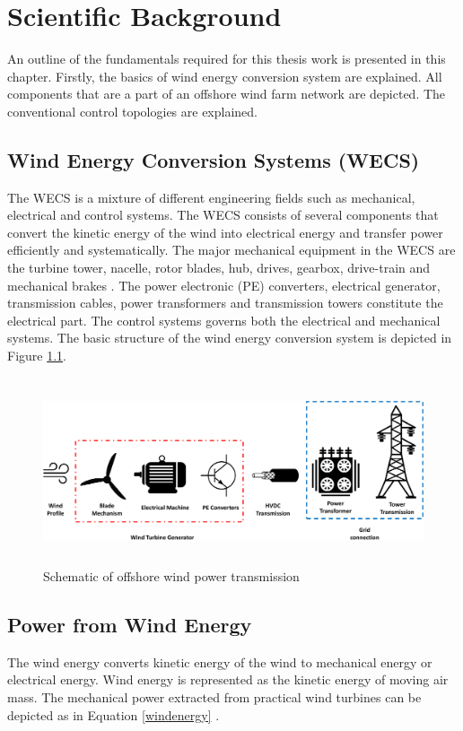 \chapter{Scientific Background}\label{2}
An outline of the fundamentals required for this thesis work is presented in this chapter. Firstly, the basics of wind energy conversion system are explained. All components that are a part of an offshore wind farm network are depicted. The conventional control topologies are explained.

\section{Wind Energy Conversion Systems (WECS)}\label{WECS_theory}
The \gls{WECS} is a mixture of different engineering fields such as mechanical, electrical and control systems. The \gls{WECS} consists of several components that convert the kinetic energy of the wind into electrical energy and transfer power efficiently and systematically. The major mechanical equipment in the \gls{WECS} are the turbine tower, nacelle, rotor blades, hub, drives, gearbox, drive-train and mechanical brakes \cite{manwell2010wind}. The power electronic (\gls{PE}) converters, electrical generator, transmission cables, power transformers and transmission towers constitute the electrical part. The control systems \cite{yaramasu_high-power_2015} governs both the electrical and mechanical systems.
The basic structure of the wind energy conversion system is depicted in Figure \ref{fig:WECS}.   

\begin{figure}[H]
\centering
    \includegraphics[height = 5.5cm,width = 15.5cm]{Diagrams/Chapter_2/WECS.pdf}
    \caption{Schematic of offshore wind power transmission}
    \label{fig:WECS}
\end{figure}

\section{Power from Wind Energy} 
The wind energy converts kinetic energy of the wind to mechanical energy or electrical energy. Wind energy is represented as the kinetic energy of moving air mass. The mechanical power extracted from practical wind turbines can be depicted as in Equation \ref{windenergy} \cite{ali_wind_2012}.

